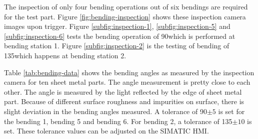 The inspection of only four bending operations out of six bendings are required for the test part. Figure \ref{fig:bending-inspection} shows these inspection camera images upon trigger. Figure \ref{subfig:inspection-1}, \ref{subfig:inspection-5} and \ref{subfig:inspection-6} tests the bending operation of 90\textdegree which is performed at bending station 1. Figure \ref{subfig:inspection-2} is the testing of bending of 135\textdegree which happens at bending station 2.

Table \ref{tab:bending-data} shows the bending angles as measured by the inspection camera for ten sheet metal parts. The angle measurement is pretty close to each other. The angle is measured by the light reflected by the edge of sheet metal part. Because of different surface roughness and impurities on surface, there is slight deviation in the bending angles measured. A tolerance of 90$\pm5$\textdegree{} is set for the bending 1, bending 5 and bending 6. For bending 2, a tolerance of 135$\pm10$\textdegree{} is set. These tolerance values can be adjusted on the SIMATIC HMI.

